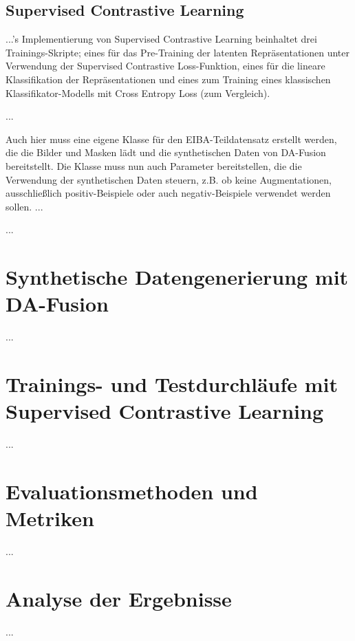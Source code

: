 \subsection{Supervised Contrastive Learning}

...'s Implementierung von Supervised Contrastive Learning beinhaltet drei Trainings-Skripte; eines für das Pre-Training der latenten Repräsentationen unter Verwendung der Supervised Contrastive Loss-Funktion, eines für die lineare Klassifikation der Repräsentationen und eines zum Training eines klassischen Klassifikator-Modells mit Cross Entropy Loss (zum Vergleich).

...

Auch hier muss eine eigene Klasse für den EIBA-Teildatensatz erstellt werden, die die Bilder und Masken lädt und die synthetischen Daten von DA-Fusion bereitstellt. Die Klasse muss nun auch Parameter bereitstellen, die die Verwendung der synthetischen Daten steuern, z.B. ob keine Augmentationen, ausschließlich positiv-Beispiele oder auch negativ-Beispiele verwendet werden sollen. ...


...

\section{Synthetische Datengenerierung mit DA-Fusion}


...

\section{Trainings- und Testdurchläufe mit Supervised Contrastive Learning}


...

\section{Evaluationsmethoden und Metriken}


...

\section{Analyse der Ergebnisse}

...